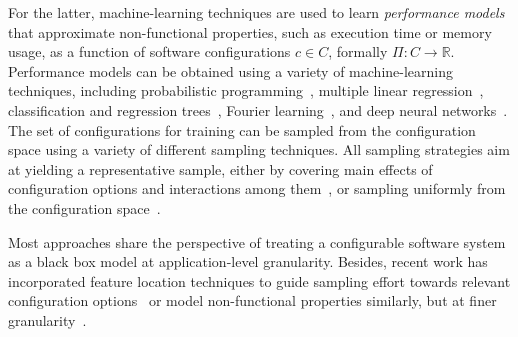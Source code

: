 For the latter, machine-learning techniques are used to learn \emph{performance models} that approximate non-functional properties, such as execution time or memory usage, as a function of software configurations $c \in C$, formally $\Pi: C \rightarrow \mathbb{R}$.
Performance models can be obtained using a variety of machine-learning techniques, including probabilistic programming~\cite{dorn2020}, multiple linear regression~\cite{siegmundPerformanceinfluenceModelsHighly2015}, classification and regression trees~\cite{sarkarCostEfficientSamplingPerformance,guo_2018_data}, Fourier learning~\cite{fourier_learning_2015,perLasso}, and deep neural networks~\cite{haDeepPerf2019,perfAL}.
The set of configurations for training can be sampled from the configuration space using a variety of different sampling techniques. All sampling strategies aim at yielding a representative sample, either by covering main effects of configuration options and interactions among them~\cite{siegmundPredictingPerformanceAutomated2012}, or sampling uniformly from the configuration space~\cite{ohFindingNearoptimalConfigurations2017,kaltenecker_distance-based_2019}.

Most approaches share the perspective of treating a configurable software system as a black box model at application-level granularity. Besides, recent work has incorporated feature location techniques to guide sampling effort towards relevant configuration options~\cite{velez_2020_configcrusher_jase,velez_comprex_2021} or model non-functional properties similarly, but at finer granularity~\cite{weber_white_2021}.

